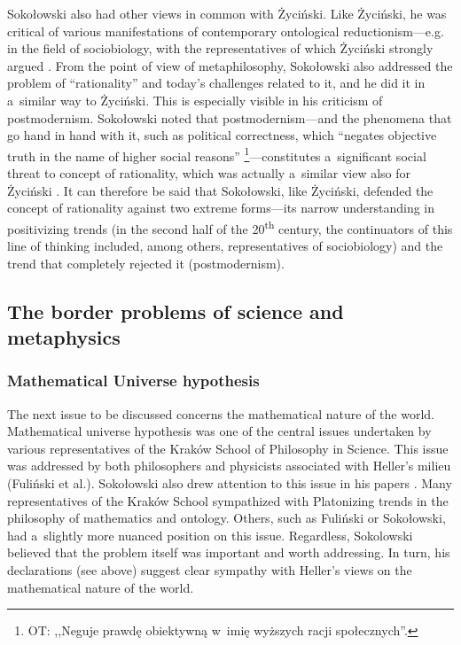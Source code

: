 \documentclass[%
  manuscript=article,
  year=2024,
  volume=77,
  doi=00000.000,
]{zfn}
\begin{document}
Sokołowski also had other views in common with Życiński. Like Życiński, he was critical of various manifestations of contemporary ontological reductionism---e.g. in the field of sociobiology, with the representatives of which Życiński strongly argued 
\parencites[][p.219]{}[][pp.243–268]{}. %
 From the point of view of metaphilosophy, Sokołowski also addressed the problem of ``rationality'' and today's challenges related to it, and he did it in a~similar way to Życiński. This is especially visible in his criticism of postmodernism. Sokołowski noted that postmodernism---and the phenomena that go hand in hand with it, such as political correctness, which ``negates objective truth in the name of higher social reasons'' 
\parencite[][p.379]{}%
\footnote{OT: ,,Neguje prawdę obiektywną w~imię wyższych racji społecznych''.}---constitutes a~significant social threat to concept of rationality, which was actually a~similar view also for Życiński 
\parencite[][]{}. %
 It can therefore be said that Sokołowski, like Życiński, defended the concept of rationality against two extreme forms---its narrow understanding in positivizing trends (in the second half of the 20\textsuperscript{th} century, the continuators of this line of thinking included, among others, representatives of sociobiology) and the trend that completely rejected it (postmodernism).



\subsection{ The border problems of science and metaphysics}



\subsubsection{Mathematical Universe hypothesis }



The next issue to be discussed concerns the mathematical nature of the world. Mathematical universe hypothesis was one of the central issues undertaken by various representatives of the Kraków School of Philosophy in Science. This issue was addressed by both philosophers and physicists associated with Heller's milieu (Fuliński et al.). Sokołowski also drew attention to this issue in his papers 
\parencites[see e.g,][]{}[][]{}[][]{}[][]{}. %
 Many representatives of the Kraków School sympathized with Platonizing trends in the philosophy of mathematics and ontology. Others, such as Fuliński or Sokołowski, had a~slightly more nuanced position on this issue. Regardless, Sokolowski believed that the problem itself was important and worth addressing. In turn, his declarations (see above) suggest clear sympathy with Heller's views on the mathematical nature of the world.
\end{document}
